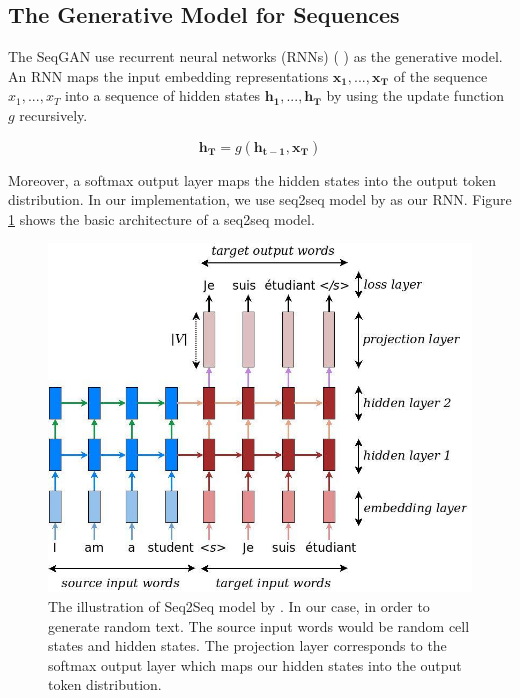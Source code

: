 \documentclass[conference]{IEEEtran}
\begin{document}
\subsection{The Generative Model for Sequences}

The SeqGAN use recurrent neural networks (RNNs) (\citeauthor{hochreiter1997long} \cite{hochreiter1997long}) as the generative model. An RNN maps the input embedding representations $ \bm{x_1},..., \bm{x_T} $ of the sequence $ x_1,..., x_T $ into a sequence of hidden states $ \bm{h_1},...,\bm{h_T} $ by using the update function $ g $ recursively.

\begin{equation}\label{eq3}
	\bm{h_T} = g(\bm{h_{t-1}}, \bm{x_T})
\end{equation}

Moreover, a softmax output layer maps the hidden states into the output token distribution. In our implementation, we use seq2seq model by \citeauthor{luong17} \cite{luong17} as our RNN. Figure \ref{fig:seq2seq} shows the basic architecture of a seq2seq model. 

\begin{figure}
	\centering
	\includegraphics[width=\columnwidth]{seq2seq.jpg}
	\caption{The illustration of Seq2Seq model by \cite{luong17}. In our case, in order to generate random text. The source input words would be random cell states and hidden states. The projection layer corresponds to the softmax output layer which maps our hidden states into the output token distribution.}	
	\label{fig:seq2seq}
\end{figure}
\end{document}
